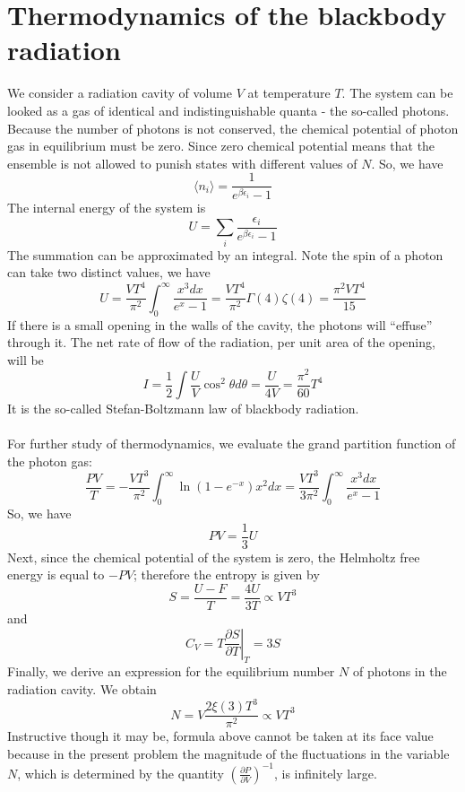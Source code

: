 \section{Thermodynamics of the blackbody radiation}
We consider a radiation cavity of volume $V$ at temperature $T$. The system can be looked as a gas of identical and indistinguishable quanta - the so-called photons. 
Because the number of photons is not conserved, the chemical potential of photon gas in equilibrium must be zero. Since zero chemical potential means that the ensemble is not allowed to punish states with different values of $N$. 
So, we have
\[\langle n_i \rangle = \frac{1}{e^{\beta \epsilon_i} - 1}\]
The internal energy of the system is
\[ U = \sum_i \frac{\epsilon_i}{e^{\beta \epsilon_i} - 1}\]
The summation can be approximated by an integral. Note the spin of a photon can take two distinct values, we have
\[U = \frac{VT^4}{\pi^2} \int_0^{\infty} \frac{x^3dx}{e^x - 1} = \frac{VT^4}{\pi^2} \Gamma(4)\zeta(4) = \frac{\pi^2VT^4}{15}\]
If there is a small opening in the walls of the cavity, the photons will ``effuse'' through it. The net rate of flow of the radiation, per unit area of the opening, will be
\[I = \frac{1}{2} \int \frac{U}{V} \cos^2\theta d\theta = \frac{U}{4V} = \frac{\pi^2}{60}T^4\]
It is the so-called Stefan-Boltzmann law of blackbody radiation.
\\ \\
For further study of thermodynamics, we evaluate the grand partition function of the photon gas:
\[\frac{PV}{T} = -\frac{VT^3}{\pi^2} \int_0^{\infty} \ln(1-e^{-x}) x^2 dx = \frac{VT^3}{3\pi^2} \int_0^{\infty} \frac{x^3dx}{e^x - 1}\]
So, we have 
\[PV = \frac{1}{3}U\]
Next, since the chemical potential of the system is zero, the Helmholtz free energy is equal to $-PV$; therefore the entropy is given by
\[S = \frac{U-F}{T} = \frac{4U}{3T} \propto VT^3\]
and
\[C_V = T \left. \frac{\partial S}{\partial T} \right|_T = 3S\]
Finally, we derive an expression for the equilibrium number $N$ of photons in the radiation cavity. We obtain
\[N = V\frac{2\xi(3)T^3}{\pi^2} \propto VT^3\]
Instructive though it may be, formula above cannot be taken at its face value because in the present problem the magnitude of the fluctuations in the variable $N$, which is determined by the quantity $\left(\frac{\partial P}{\partial V} \right)^{-1}$, is infinitely large.